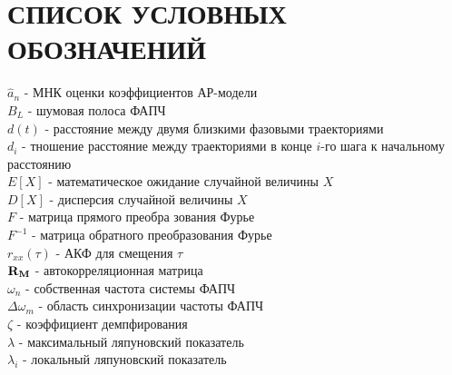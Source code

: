 \section*{СПИСОК УСЛОВНЫХ ОБОЗНАЧЕНИЙ}
\noindent
${\hat{a}_n}$ - МНК оценки коэффициентов АР-модели		\\
${B_L}$ - шумовая полоса ФАПЧ					\\
${d(t)}$ - расстояние между двумя близкими фазовыми траекториями	\\
${d_i}$ - тношение расстояние между траекториями в конце ${i}$-го шага к начальному расстоянию\\
${E[X]}$ - математическое ожидание случайной величины $X$	\\
${D[X]}$ - дисперсия случайной величины $X$			\\
${F}$ - матрица прямого преобра зования Фурье			\\
${F^{-1}}$ - матрица обратного преобразования Фурье		\\
${r_{xx}(\tau)}$ - АКФ для смещения ${\tau}$			\\
${\bf{R_M}}$ - автокорреляционная матрица			\\
${\omega_n}$ - собственная частота системы ФАПЧ			\\
${\Delta \omega_m}$ - область синхронизации частоты ФАПЧ	\\
${\zeta}$ - коэффициент демпфирования				\\
${\lambda}$ - максимальный ляпуновский показатель		\\
${\lambda_{i}}$ - локальный ляпуновский показатель		\\


\newpage
